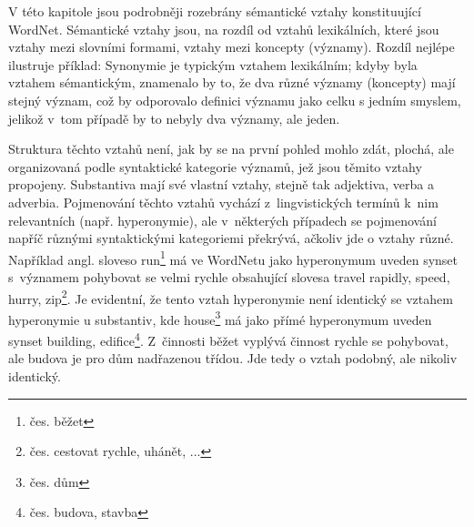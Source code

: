 \documentclass[a4paper, 11pt, oneside, showtrims]{book}
\newcommand{\td}[2][]{
	{\hskip -0.5em\todo[size=\footnotesize]{#2}}
}
\newcommand\ex{\textsf}
\begin{document}







				V této kapitole jsou podrobněji rozebrány sémantické vztahy konstituující WordNet. Sémantické vztahy jsou, na rozdíl od vztahů lexikálních, které jsou vztahy mezi slovními formami, vztahy mezi koncepty (významy). Rozdíl nejlépe ilustruje příklad: Synonymie je typickým vztahem lexikálním; kdyby byla vztahem sémantickým, znamenalo by to, že dva různé významy (koncepty) mají stejný význam, což by odporovalo definici významu jako celku s jedním smyslem, jelikož v~tom případě by to nebyly dva významy, ale jeden. 

				Struktura těchto vztahů není, jak by se na první pohled mohlo zdát, plochá, ale organizovaná podle syntaktické kategorie významů, jež jsou těmito vztahy propojeny. Substantiva mají své vlastní vztahy, stejně tak adjektiva, verba a adverbia. Pojmenování těchto vztahů vychází z~lingvistických termínů k~nim relevantních (např. hyperonymie), ale v~některých případech se pojmenování napříč různými syntaktickými kategoriemi překrývá, ačkoliv jde o vztahy různé. Například angl. sloveso \ex{run}\footnote{čes. \ex{běžet}} má ve WordNetu jako hyperonymum uveden synset s~významem \ex{pohybovat se velmi rychle} obsahující slovesa \ex{travel rapidly, speed, hurry, zip}\footnote{čes. \ex{cestovat rychle, uhánět, ...}}. Je evidentní, že tento vztah hyperonymie není identický se vztahem hyperonymie u substantiv, kde \ex{house}\footnote{čes. \ex{dům}} má jako přímé hyperonymum uveden synset \ex{building, edifice}\footnote{čes. \ex{budova, stavba}}. Z~činnosti \ex{běžet} vyplývá činnost \ex{rychle se pohybovat}, ale \ex{budova} je pro \ex{dům} nadřazenou třídou. Jde tedy o vztah podobný, ale nikoliv identický. \parencite{princetonWN}
\end{document}
